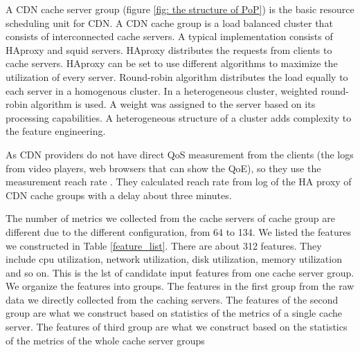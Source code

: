 \documentclass[5p]{elsarticle}
\newcommand{\dabiaolv}{reach rate }
\begin{document}
A CDN cache server group (figure \ref{fig: the structure of PoP}) is the basic resource scheduling unit for CDN. A CDN cache group is a load balanced cluster that consists of interconnected cache servers. A typical implementation consists of HAproxy and squid servers. HAproxy distributes the requests from clients to cache servers. HAproxy can be set to use different algorithms to maximize the utilization of every server. Round-robin algorithm distributes the load equally to each server in a homogenous cluster. In a heterogeneous cluster, weighted round-robin algorithm is used. A weight was assigned to the server based on its processing capabilities. A heterogeneous structure of a cluster adds complexity to the feature engineering.

As CDN providers do not have direct QoS measurement from the clients (the logs from video players, web browsers that can show the QoE), so they use the measurement \dabiaolv. They calculated \dabiaolv from log of the HA proxy of CDN cache groups with a delay about three minutes.  

The number of metrics we collected from the cache servers of cache group are different due to the different configuration, from 64 to 134. We listed the features we constructed in Table \ref{feature_list}. There are about 312 features. They include cpu utilization, network utilization, disk utilization, memory utilization and so on. This is the lst of candidate input features from one cache server group. We organize the features into groups. The features in the first group from the raw data we directly collected from the caching servers. The features of the second group are what we construct based on statistics of the metrics of a single cache server. The features of third group are what we construct based on the statistics of the metrics of the whole cache server groups
\end{document}
